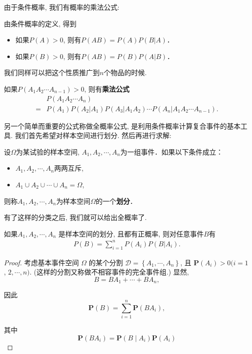 由于条件概率, 我们有概率的乘法公式:

\begin{theorem}[乘法公式]
    由条件概率的定义, 得到
    \begin{itemize}
        \item 如果$P(A)>0$, 则有$P(AB)=P(A)P(B|A)$．
        \item 如果$P(B)>0$, 则有$P(AB)=P(B)P(A|B)$．
    \end{itemize}
\end{theorem}

我们同样可以把这个性质推广到$n$个物品的时候.

\begin{corollary}
    如果$P(A_1 A_2\cdots A_{n-1})>0$, 则有\textbf{乘法公式}
    \begin{align*}
          & P(A_1A_2\cdots A_n)                                                \\
        = & P(A_1)P(A_2|A_1)P(A_3|A_1 A_2)\cdots P(A_n|A_1 A_2\cdots A_{n-1}).
    \end{align*}
\end{corollary}



另一个简单而重要的公式称做全概率公式, 是利用条件概率计算复合事件的基本工具. 我们首先希望对样本空间进行划分. 然后再进行求解:

\begin{definition}
    设$\Omega$为某试验的样本空间, $A_1, A_2, \cdots, A_n$为一组事件．如果以下条件成立：
    \begin{itemize}
        \item $A_1, A_2, \cdots, A_n$两两互斥, 
        \item $A_1 \cup A_2 \cup \cdots \cup A_n=\Omega$, 
    \end{itemize}
    则称$A_1, A_2, \cdots , A_n$为样本空间$\Omega$的一个\textbf{划分}．
\end{definition}


有了这样的分类之后, 我们就可以给出全概率了.

\begin{theorem}[全概率公式]
    如果$A_1, A_2, \cdots, A_n$ 是样本空间的划分, 且都有正概率, 则对任意事件$B$有
    \begin{align*}
        P(B)=\sum_{i=1}^n P(A_i) P(B|A_i).
    \end{align*}
\end{theorem}

\begin{proof}
    考虑基本事件空间 $\Omega$ 的某个分割 $\mathscr{D}=\left\{A_1, \cdots, A_n\right\}$, 且 $\mathbf{P}\left(A_i\right)>0(i=1$, $2, \cdots, n)$. (这样的分割又称做不相容事件的完全事件组.) 显然,
$$
B=B A_1+\cdots+B A_n,
$$

因此
$$
\mathbf{P}(B)=\sum_{i=1}^n \mathbf{P}\left(B A_i\right),
$$

其中
$$
\mathbf{P}\left(B A_i\right)=\mathbf{P}\left(B \mid A_i\right) \mathbf{P}\left(A_i\right)
$$
\end{proof}


